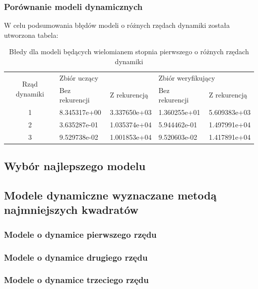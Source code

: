 \documentclass[a4paper, 11pt]{article}
\begin{document}
\subsubsection{Porównanie modeli dynamicznych}
W celu podsumowania błędów modeli o różnych rzędach dynamiki została utworzona tabela: 
\begin{table}[H]
\centering
\caption{Błedy dla modeli będących wielomianem stopnia pierwszego o różnych rzędach dynamiki}
\label{my-label}
\begin{tabular}{|c|l|l|l|l|}
\hline
\multirow{2}{*}{Rząd dynamiki} & \multicolumn{2}{l|}{Zbiór uczący} & \multicolumn{2}{l|}{Zbiór weryfikujący} \\ \cline{2-5} 
                               & Bez rekurencji   & Z rekurencją   & Bez rekurencji      & Z rekurencją      \\ \hline
1                              & 8.345317e+00     & 3.337650e+03   & 1.360255e+01        & 5.609383e+03      \\ \hline
2                              & 3.635287e-01     & 1.035374e+04   & 5.944462e-01        & 1.497991e+04      \\ \hline
3                              & 9.529738e-02     & 1.001853e+04   & 9.520603e-02        & 1.417891e+04      \\ \hline
\end{tabular}
\end{table}


\subsection{Wybór najlepszego modelu}
\subsection{Modele dynamiczne wyznaczane metodą najmniejszych kwadratów} 
\subsubsection{Modele o dynamice pierwszego rzędu}
\subsubsection{Modele o dynamice drugiego rzędu}
\subsubsection{Modele o dynamice trzeciego rzędu}
\end{document}
